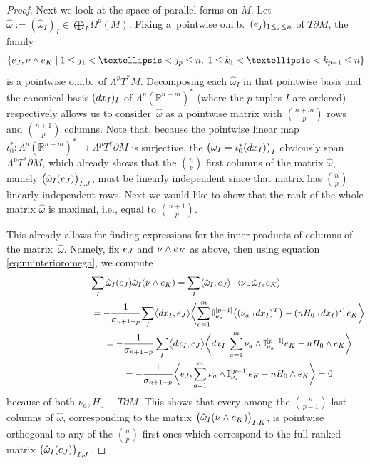 \documentclass[11pt]{article}
\numberwithin{equation}{section}
\numberwithin{equation}{section}
\begin{document}
\begin{proof}
Next we look at the space of parallel forms on $M$. Let $\hat{\omega}:=\left(\hat{\omega}_I\right)_I\in\bigoplus_I\Omega^p(M)$. Fixing a~pointwise o.n.b.\ $({\rm e}_j)_{1\leq j\leq n}$ of $T\partial M$, the family
\[\left\{{\rm e}_J,\nu\wedge {\rm e}_K \mid 1\leq j_1<\dots< j_p\leq n,\;1\leq k_1<\dots<k_{p-1}\leq n \right\}\]
is a pointwise o.n.b.\ of $\Lambda^pT^*M$. Decomposing each $\hat{\omega}_I$ in that pointwise basis and the canonical basis $({\rm d}x_I)_I$ of $\Lambda^p(\mathbb{R}^{n+m})^*$ (where the $p$-tuples $I$ are ordered) respectively allows us to consider~$\hat{\omega}$ as a pointwise matrix with $\binom{n+m}{p}$ rows and $\binom{n+1}{p}$ columns.
Note that, because the pointwise linear map $\iota_0^*\colon\Lambda^p(\mathbb{R}^{n+m})^*\to\Lambda^pT^*\partial M$ is  surjective, the $\bigl(\omega_I=\iota_0^*({\rm d}x_I)\bigr)_I$ obviously span $\Lambda^pT^*\partial M$, which already shows that the $\binom{n}{p}$ first columns of the matrix $\hat{\omega}$, namely $\bigl(\hat{\omega}_I({\rm e}_J)\bigr)_{I,J}$, must be linearly independent since that matrix has $\binom{n}{p}$ linearly independent rows. Next we would like to show that the rank of the whole matrix $\hat{\omega}$ is maximal, i.e., equal to $\binom{n+1}{p}$.

This already allows for finding expressions for the inner products of columns of the matrix~$\hat{\omega}$.
Namely, fix ${\rm e}_J$ and $\nu\wedge {\rm e}_K$ as above, then using equation \eqref{eq:nuinterioromega}, we compute
\begin{gather*}
\sum_I\hat{\omega}_I({\rm e}_J)\hat{\omega}_I(\nu\wedge {\rm e}_K)=\sum_I\langle\hat{\omega}_I,{\rm e}_J\rangle\cdot\langle\nu\lrcorner\,\hat{\omega}_I,{\rm e}_K\rangle\\
\hphantom{\sum_I\hat{\omega}_I({\rm e}_J)\hat{\omega}_I(\nu\wedge {\rm e}_K)}=-\frac{1}{\sigma_{n+1-p}}\!\sum_I\bigl\langle{\rm d}x_I,{\rm e}_J\bigr\rangle\biggl\langle\sum_{a=1}^m\mathbb{I}_{\nu_a}^{[p-1]}\bigl((\nu_a\lrcorner\,{\rm d}x_I)^T\bigr)-(nH_0\lrcorner\,{\rm d}x_I)^T\!, {\rm e}_K\biggr\rangle\\
\hphantom{\sum_I\hat{\omega}_I({\rm e}_J)\hat{\omega}_I(\nu\wedge {\rm e}_K)}=-\frac{1}{\sigma_{n+1-p}}\sum_I \bigl\langle {\rm d}x_I,{\rm e}_J\bigr\rangle\biggl\langle {\rm d}x_I,\sum_{a=1}^m\nu_a\wedge\mathbb{I}_{\nu_a}^{[p-1]}{\rm e}_K-nH_0\wedge {\rm e}_K\biggr\rangle\\
\hphantom{\sum_I\hat{\omega}_I({\rm e}_J)\hat{\omega}_I(\nu\wedge {\rm e}_K)}=-\frac{1}{\sigma_{n+1-p}}\biggl\langle {\rm e}_J,\sum_{a=1}^m \nu_a\wedge\mathbb{I}_{\nu_a}^{[p-1]}{\rm e}_K-nH_0\wedge {\rm e}_K \biggr\rangle
=0
\end{gather*}
because of both $\nu_a,H_0\perp T\partial M$. This shows that every among the $\binom{n}{p-1}$ last columns of $\hat{\omega}$, corresponding to the matrix $\bigl(\hat{\omega}_I(\nu\wedge {\rm e}_K)\bigr)_{I,K}$, is pointwise orthogonal to any of the $\binom{n}{p}$ first ones which correspond to the full-ranked matrix $\bigl(\hat{\omega}_I({\rm e}_J)\bigr)_{I,J}$.


\end{proof}
\end{document}
